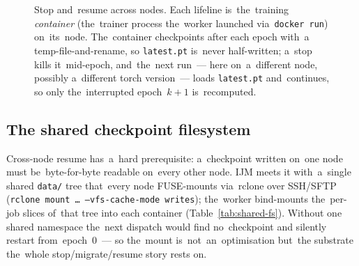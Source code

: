 \begin{figure}[H]
\centering
\footnotesize
\setlength{\unitlength}{0.7cm}
\caption{Stop and~resume across nodes.  Each lifeline is~the~training
\emph{container} (the~trainer process the~worker launched via~\texttt{docker
run}) on~its~node.  The~container checkpoints after each epoch with~a
temp-file-and-rename, so \texttt{latest.pt} is~never half-written; a~stop
kills it~mid-epoch, and~the~next run~--- here on~a~different node, possibly
a~different torch version~--- loads \texttt{latest.pt} and~continues, so only
the~interrupted epoch~$k{+}1$ is~recomputed.}
\label{fig:seq-resume}
\end{figure}

\subsection{The shared checkpoint filesystem}

Cross-node resume has~a~hard prerequisite: a~checkpoint written on~one node
must be~byte-for-byte readable on~every other node.  IJM meets it with~a~single
shared \texttt{data/} tree that~every node FUSE-mounts via~rclone over SSH/SFTP
(\texttt{rclone mount \ldots\ --vfs-cache-mode writes}); the~worker bind-mounts
the~per-job slices of~that tree into each container (Table~\ref{tab:shared-fs}).
Without one shared namespace the~next dispatch would find no~checkpoint and
silently restart from~epoch~0~--- so the~mount is~not~an~optimisation but~the
substrate the~whole stop/migrate/resume story rests on.

